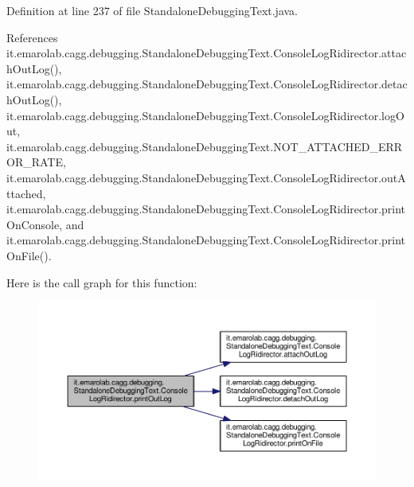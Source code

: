Definition at line 237 of file Standalone\-Debugging\-Text.\-java.



References it.\-emarolab.\-cagg.\-debugging.\-Standalone\-Debugging\-Text.\-Console\-Log\-Ridirector.\-attach\-Out\-Log(), it.\-emarolab.\-cagg.\-debugging.\-Standalone\-Debugging\-Text.\-Console\-Log\-Ridirector.\-detach\-Out\-Log(), it.\-emarolab.\-cagg.\-debugging.\-Standalone\-Debugging\-Text.\-Console\-Log\-Ridirector.\-log\-Out, it.\-emarolab.\-cagg.\-debugging.\-Standalone\-Debugging\-Text.\-N\-O\-T\-\_\-\-A\-T\-T\-A\-C\-H\-E\-D\-\_\-\-E\-R\-R\-O\-R\-\_\-\-R\-A\-T\-E, it.\-emarolab.\-cagg.\-debugging.\-Standalone\-Debugging\-Text.\-Console\-Log\-Ridirector.\-out\-Attached, it.\-emarolab.\-cagg.\-debugging.\-Standalone\-Debugging\-Text.\-Console\-Log\-Ridirector.\-print\-On\-Console, and it.\-emarolab.\-cagg.\-debugging.\-Standalone\-Debugging\-Text.\-Console\-Log\-Ridirector.\-print\-On\-File().



Here is the call graph for this function\-:\nopagebreak
\begin{figure}[H]
\begin{center}
\leavevmode
\includegraphics[width=350pt]{classit_1_1emarolab_1_1cagg_1_1debugging_1_1StandaloneDebuggingText_1_1ConsoleLogRidirector_ad30742574f8fa8a285d501852da0e4bd_cgraph}
\end{center}
\end{figure}


